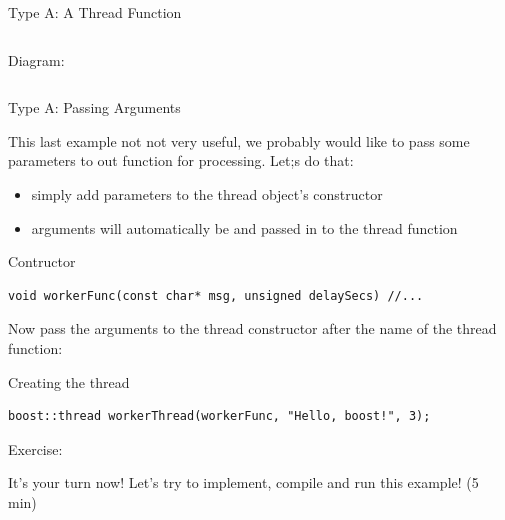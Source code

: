 \documentclass[8pt]{beamer}
\begin{document}
\begin{frame}[fragile]{Type A: A Thread Function}
\begin{columns}
\begin{block}{Diagram:}
\end{block}

\end{columns}
 
\end{frame}

\begin{frame}[fragile]{Type A: Passing Arguments}

This last example not not very useful, we probably would like to pass some parameters to out function for processing. Let;s do that:

\begin{itemize}
  \item simply add parameters to the thread object’s constructor
  \item arguments will automatically be and passed in to the thread function
\end{itemize}

\begin{exampleblock}{Contructor}

\begin{lstlisting}
void workerFunc(const char* msg, unsigned delaySecs) //...
\end{lstlisting}

\end{exampleblock}

Now pass the arguments to the thread constructor after the name of the thread function:

\begin{exampleblock}{Creating the thread}

\begin{lstlisting}
boost::thread workerThread(workerFunc, "Hello, boost!", 3);
\end{lstlisting}

\end{exampleblock}

\begin{block}{Exercise:}

It's your turn now! Let's try to implement, compile and run this example! (5 min)
 
\end{block}

\end{frame}
\end{document}
